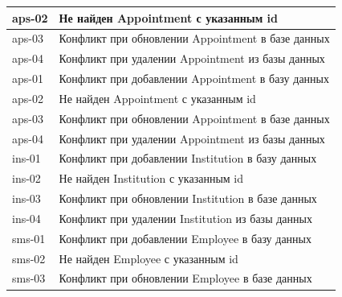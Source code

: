 \documentclass[a4paper,article]{article}
\begin{document}
\begin{sloppypar}
\begin{appendices}
\begin{xltabular}{\textwidth} { |
                >{\hsize} X |
                >{\hsize} X | }
            \hline
            aps-02
            & Не найден Appointment с указанным id \\
            
            \hline
            aps-03
            & Конфликт при обновлении Appointment в базе данных \\
            
            \hline
            aps-04
            & Конфликт при удалении Appointment из базы данных \\
            
            \hline
            aps-01
            & Конфликт при добавлении Appointment в базу данных \\
            
            \hline
            aps-02
            & Не найден Appointment с указанным id \\
            
            \hline
            aps-03
            & Конфликт при обновлении Appointment в базе данных \\
            
            \hline
            aps-04
            & Конфликт при удалении Appointment из базы данных \\
            
            \hline
            ins-01
            & Конфликт при добавлении Institution в базу данных \\
            
            \hline
            ins-02
            & Не найден Institution с указанным id \\
            
            \hline
            ins-03
            & Конфликт при обновлении Institution в базе данных \\
            
            \hline
            ins-04
            & Конфликт при удалении Institution из базы данных \\
            
            \hline
            sms-01
            & Конфликт при добавлении Employee в базу данных \\
            
            \hline
            sms-02
            & Не найден Employee с указанным id \\
            
            \hline
            sms-03
            & Конфликт при обновлении Employee в базе данных \\
            

\end{xltabular}
\end{appendices}
\end{sloppypar}
\end{document}
